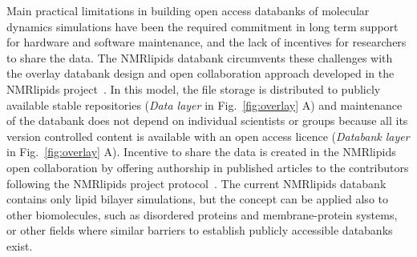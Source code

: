 \documentclass[fleqn,10pt]{wlscirep}
\begin{document}
Main practical limitations in building open access databanks of molecular dynamics simulations have been the required commitment in long term support for hardware and software maintenance, and the lack of incentives for researchers to share the data. The NMRlipids databank circumvents these challenges with the overlay databank design and open collaboration approach developed in the NMRlipids project~\cite{botan15}. In this model, the file storage is distributed to publicly available stable repositories (\textit{Data layer} in Fig.~\ref{fig:overlay} A) and maintenance of the databank does not depend on individual scientists or groups because all its version controlled content is available with an open access licence (\textit{Databank layer} in Fig.~\ref{fig:overlay} A). 
%
Incentive to share the data is created in the NMRlipids open collaboration by offering authorship in published articles to the contributors following the NMRlipids project protocol~\cite{botan15}.
%
%
%
The current NMRlipids databank contains only lipid bilayer simulations, but the concept can be applied also to other biomolecules, such as disordered proteins and membrane-protein systems,
or other fields where similar barriers to establish publicly accessible databanks exist. 

%
\end{document}
